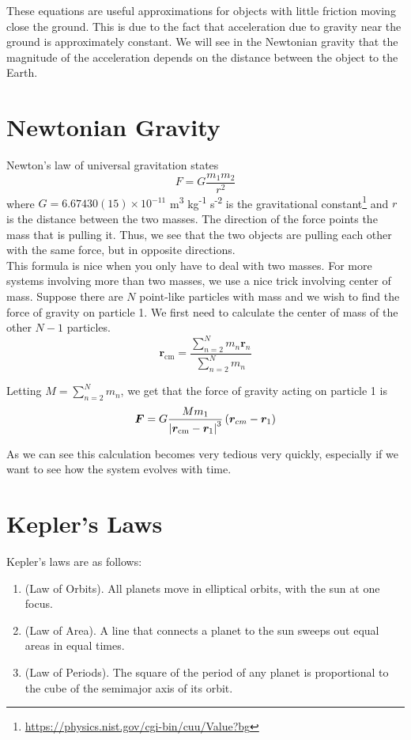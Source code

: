 \documentclass[oneside]{book}
\numberwithin{figure}{section}
\numberwithin{equation}{section}
\newcommand{\paren}[1]{\left(#1\right)}
\theoremstyle{definition}
\begin{document}
	These equations are useful approximations for objects with little friction moving close the ground. This is due to the fact that acceleration due to gravity near the ground is approximately constant. We will see in the Newtonian gravity that the magnitude of the acceleration depends on the distance between the object to the Earth.
	
	\section{Newtonian Gravity}
	Newton's law of universal gravitation states
	\begin{equation}
		F = G\dfrac{m_1m_2}{r^2}
	\end{equation}
	where $ G = 6.67430(15) \times 10^{-11} $ m\textsuperscript{3} kg\textsuperscript{-1} s\textsuperscript{-2} is the gravitational constant\footnote{\url{https://physics.nist.gov/cgi-bin/cuu/Value?bg}} and $ r $ is the distance between the two masses. The direction of the force points the mass that is pulling it. Thus, we see that the two objects are pulling each other with the same force, but in opposite directions.\\
	
	This formula is nice when you only have to deal with two masses. For more systems involving more than two masses, we use a nice trick involving center of mass. Suppose there are $ N $ point-like particles with mass and we wish to find the force of gravity on particle 1. We first need to calculate the center of mass of the other $ N - 1 $ particles.
	\begin{equation}
		\bm{r}_\text{cm} = \dfrac{\sum_{n = 2}^{N}m_n\bm{r}_n}{\sum_{n = 2}^{N}m_n}
	\end{equation}

	Letting $ M = \sum_{n = 2}^{N}m_n $, we get that the force of gravity acting on particle 1 is
	\begin{equation}
		\bm{F} = G\dfrac{Mm_1}{\abs{\bm{r}_\text{cm} - \bm{r}_1}^3}\paren{\bm{r}_{cm} - \bm{r}_1}
	\end{equation}

	As we can see this calculation becomes very tedious very quickly, especially if we want to see how the system evolves with time.
	
	\section{Kepler's Laws}
	Kepler's laws are as follows:
	\begin{enumerate}
		\item (Law of Orbits). All planets move in elliptical orbits, with the sun at one focus.
		
		\item (Law of Area). A line that connects a planet to the sun sweeps out equal areas in equal times.
		
		\item (Law of Periods). The square of the period of any planet is proportional to the cube of the semimajor axis of its orbit.
	\end{enumerate}
\end{document}
